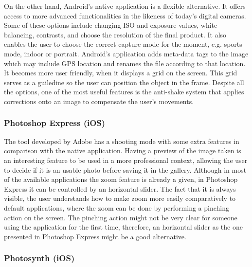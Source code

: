 On the other hand, Android's native application is a flexible alternative. It offers access to more advanced functionalities in the likeness of today's digital cameras.
Some of these options include changing ISO and exposure values, white-balancing, contrasts, and choose the resolution of the final product. It also enables the user to choose the correct capture mode for the moment, e.g. sports mode, indoor or portrait.
Android's application adds meta-data tags to the image which may include GPS location and renames the file according to that location. It becomes more user friendly, when it displays a grid on the screen. This grid serves as a guiledine so the user can position the object in the frame. Despite all the options, one of the most useful features is the anti-shake system that applies corrections onto an image to compensate the user's movements.

\subsubsection{Photoshop Express (iOS)}

The tool developed by Adobe \cite{Photoshop} has a shooting mode with some extra features in comparison with the native application.
Having a preview of the image taken is an interesting feature to be used in a more professional context, allowing the user to decide if it is an usable photo before saving it in the gallery.
Although in most of the available applications the zoom feature is already a given, in Photoshop Express it can be controlled by an horizontal slider. The fact that it is always visible, the user understands how to make zoom more easily comparatively to default applications, where the zoom can be done by performing a pinching action on the screen. The pinching action might not be very clear for someone using the application for the first time, therefore, an horizontal slider as the one presented in Photoshop Express might be a good alternative.

\subsubsection{Photosynth (iOS)}

